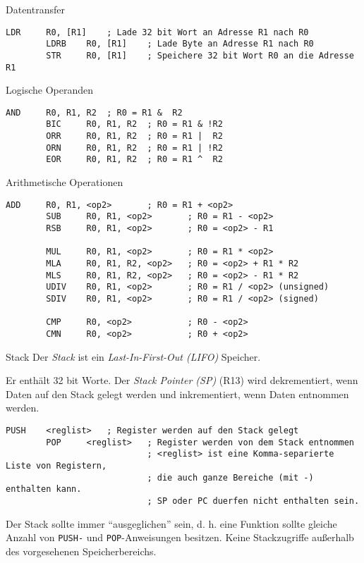 \begin{defi}{Datentransfer}
    \begin{lstlisting}[language={[x86masm]Assembler}]
        LDR     R0, [R1]    ; Lade 32 bit Wort an Adresse R1 nach R0
        LDRB    R0, [R1]    ; Lade Byte an Adresse R1 nach R0
        STR     R0, [R1]    ; Speichere 32 bit Wort R0 an die Adresse R1  
    \end{lstlisting}
\end{defi}

\begin{defi}{Logische Operanden}
    \begin{lstlisting}[language={[x86masm]Assembler}]
        AND     R0, R1, R2  ; R0 = R1 &  R2
        BIC     R0, R1, R2  ; R0 = R1 & !R2
        ORR     R0, R1, R2  ; R0 = R1 |  R2
        ORN     R0, R1, R2  ; R0 = R1 | !R2
        EOR     R0, R1, R2  ; R0 = R1 ^  R2
    \end{lstlisting}
\end{defi}

\begin{defi}{Arithmetische Operationen}
    \begin{lstlisting}[language={[x86masm]Assembler}]
        ADD     R0, R1, <op2>       ; R0 = R1 + <op2>
        SUB     R0, R1, <op2>       ; R0 = R1 - <op2>
        RSB     R0, R1, <op2>       ; R0 = <op2> - R1

        MUL     R0, R1, <op2>       ; R0 = R1 * <op2>
        MLA     R0, R1, R2, <op2>   ; R0 = <op2> + R1 * R2
        MLS     R0, R1, R2, <op2>   ; R0 = <op2> - R1 * R2
        UDIV    R0, R1, <op2>       ; R0 = R1 / <op2> (unsigned)
        SDIV    R0, R1, <op2>       ; R0 = R1 / <op2> (signed)

        CMP     R0, <op2>           ; R0 - <op2>
        CMN     R0, <op2>           ; R0 + <op2>
    \end{lstlisting}
\end{defi}

\begin{defi}{Stack}
    Der \emph{Stack} ist ein \emph{Last-In-First-Out (LIFO)} Speicher.

    Er enthält 32 bit Worte.
    Der \emph{Stack Pointer (SP)} (R13) wird dekrementiert, wenn Daten auf den Stack gelegt werden und inkrementiert, wenn Daten entnommen werden.

    \begin{lstlisting}[language={[x86masm]Assembler}]
        PUSH    <reglist>   ; Register werden auf den Stack gelegt
        POP     <reglist>   ; Register werden von dem Stack entnommen
                            ; <reglist> ist eine Komma-separierte Liste von Registern,
                            ; die auch ganze Bereiche (mit -) enthalten kann.
                            ; SP oder PC duerfen nicht enthalten sein.
    \end{lstlisting}

    Der Stack sollte immer \enquote{ausgeglichen} sein, d. h. eine Funktion sollte gleiche Anzahl von \texttt{PUSH-} und \texttt{POP}-Anweisungen besitzen.
    Keine Stackzugriffe außerhalb des vorgesehenen Speicherbereichs.
\end{defi}

